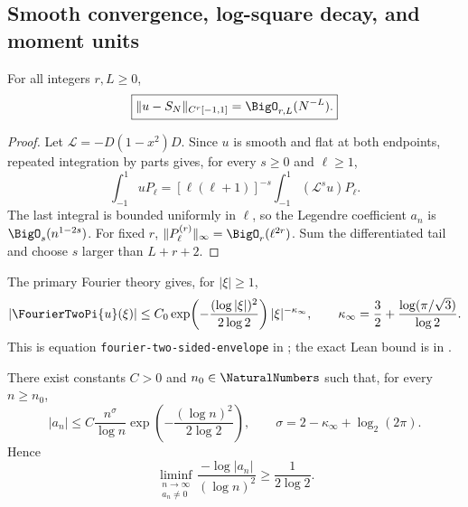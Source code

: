 \subsection{Smooth convergence, log-square decay, and moment units}

\begin{theorem}
\label{thm:leg2-Cinfty-convergence}
For all integers $r,L\ge0$,
\begin{equation}
 \boxed{\|u-S_N\|_{C^r[-1,1]}=\BigO_{r,L}(N^{-L}).}
 \label{eq:leg2-Cinfty-convergence}
\end{equation}
\end{theorem}

\begin{proof}
Let $\mathcal L=-D(1-x^2)D$.  Since $u$ is smooth and flat at both endpoints,
repeated integration by parts gives, for every $s\ge0$ and $\ell\ge1$,
\[
 \int_{-1}^{1}uP_\ell
 =[\ell(\ell+1)]^{-s}
 \int_{-1}^{1}(\mathcal L^su)P_\ell.
\]
The last integral is bounded uniformly in $\ell$, so the Legendre coefficient
$a_n$ is $\BigO_s(n^{1-2s})$.  For fixed $r$,
$\|P_\ell^{(r)}\|_\infty=\BigO_r(\ell^{2r})$.  Sum the differentiated tail
and choose $s$ larger than $L+r+2$.
\end{proof}

The primary Fourier theory gives, for $|\xi|\ge1$,
\begin{equation}
 |\FourierTwoPi{u}(\xi)|\le C_0
 \exp\!\left(-\frac{(\log|\xi|)^2}{2\log2}\right)
 |\xi|^{-\kappa_\infty},
 \qquad
 \kappa_\infty=\frac32+
 \frac{\log(\pi/\sqrt3)}{\log2}.
 \label{eq:leg2-fourier-envelope}
\end{equation}
This is equation \texttt{fourier-two-sided-envelope} in
; the exact Lean bound is
 in
.

\begin{theorem}
\label{thm:leg2-log-square}
There exist constants $C>0$ and $n_0\in\NaturalNumbers$ such that, for every $n\ge n_0$,
\begin{equation}
 \boxed{|a_n|\le
 C\frac{n^\sigma}{\log n}
 \exp\!\left(-\frac{(\log n)^2}{2\log2}\right),}
 \qquad
 \sigma=2-\kappa_\infty+\log_2(2\pi).
 \label{eq:leg2-log-square}
\end{equation}
Hence
\begin{equation}
 \liminf_{\substack{n\to\infty\\a_n\ne0}}
 \frac{-\log|a_n|}{(\log n)^2}\ge\frac1{2\log2}.
 \label{eq:leg2-log-square-liminf}
\end{equation}
\end{theorem}

